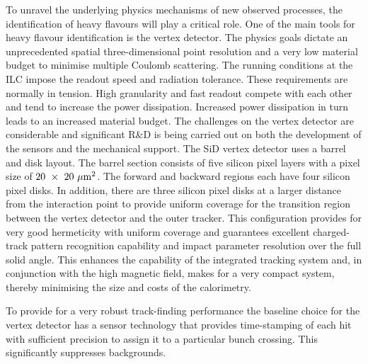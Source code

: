 To unravel the underlying physics mechanisms of new observed processes, the
identification of heavy flavours will play a critical role. One of the main
tools for heavy flavour identification is the vertex detector. The physics goals
dictate an unprecedented spatial three-dimensional point resolution and a very
low material budget to minimise multiple Coulomb scattering. The running 
conditions at the ILC impose the readout speed and radiation tolerance. 
These requirements are normally in tension. High
granularity and fast readout compete with each other and tend to increase the
power dissipation. Increased power dissipation in turn leads to an increased
material budget. The challenges on the vertex detector are considerable and
significant R\&D is being carried out on both the development of the sensors and
the mechanical support.
The SiD vertex detector uses a barrel and disk layout. The barrel section
consists of five silicon pixel layers with a pixel size of
$20~\times~20~\mu\mathrm{m}^2$. The forward and backward regions each have four
silicon pixel disks. In addition, there are three silicon pixel disks at a
larger distance from the interaction point to provide uniform coverage for the
transition region between the vertex detector and the outer tracker. This
configuration provides for very good hermeticity with uniform coverage and
guarantees excellent charged-track pattern recognition capability
 and impact parameter resolution 
over the full solid angle. 
This enhances the capability of the integrated tracking system and, 
in conjunction with the high magnetic field, makes for a very compact
system, thereby minimising the size and costs of the calorimetry.

To provide for a very robust track-finding performance the baseline 
choice for the vertex detector has a sensor technology that provides
time-stamping of each hit with sufficient precision to assign it to
a particular bunch crossing. This significantly suppresses
backgrounds. 


